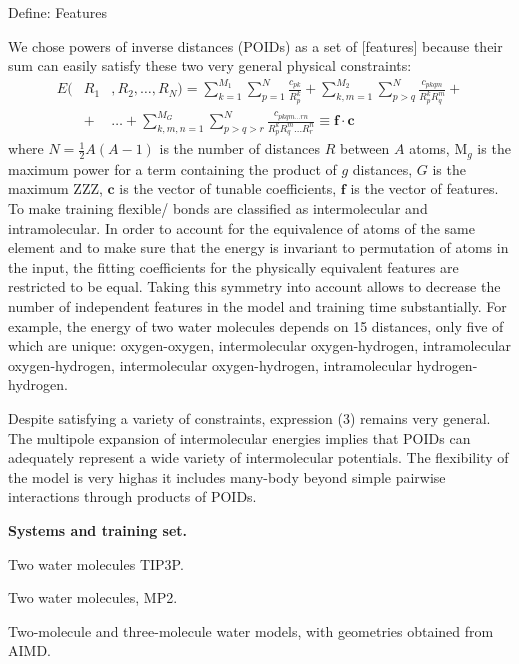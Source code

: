 \documentclass[aps,prl,reprint,amsmath,amssymb,nature]{revtex4-1}
\begin{document}
Define: Features

We chose powers of inverse distances (POIDs) as a set of [features] because their sum can easily satisfy these two very general physical constraints:
\begin{eqnarray}
E (&R_1&, R_2, \ldots, R_N) = \sum_{k=1}^{M_1} \sum_{p=1}^{N} \frac{c_{pk}}{R_p^k} + \sum_{k,m=1}^{M_2} \sum_{p>q}^{N} \frac{c_{pkqm}}{R_p^k R_q^m} + \nonumber \\
&+& \ldots +\sum_{k,m,n=1}^{M_G} \sum_{p>q>r}^{N} \frac{c_{pkqm\ldots rn}}{R_p^k R_q^m \ldots R_r^n} \equiv \mathbf{f}\cdot \mathbf{c}
\end{eqnarray}
%
where $N = \frac{1}{2}A(A-1)$ is the number of distances $R$ between $A$ atoms, M$_{g}$ is the maximum power for a term containing the product of $g$ distances, $G$ is the maximum ZZZ, $\mathbf{c}$ is the vector of tunable coefficients, $\mathbf{f}$ is the vector of features. 
\red To make training flexible/ bonds are classified as intermolecular and intramolecular. \old 
In order to account for the equivalence of atoms of the same element and to make sure that the energy is invariant to permutation of atoms in the input, the fitting coefficients for the physically equivalent features are restricted to be equal. 
Taking this symmetry into account allows to decrease the number of independent features in the model and training time substantially. 
For example, the energy of two water molecules depends on 15 distances, only five of which are unique: oxygen-oxygen, intermolecular oxygen-hydrogen, intramolecular oxygen-hydrogen, intermolecular oxygen-hydrogen, intramolecular hydrogen-hydrogen.

Despite satisfying a variety of constraints, expression (3) remains very general. 
The multipole expansion of intermolecular energies implies that POIDs can adequately represent a wide variety of intermolecular potentials. 
The flexibility of the model \red is very high\old as it includes many-body beyond simple pairwise interactions through products 
of POIDs.

\textbf{Systems and training set.} 


Two water molecules TIP3P.

Two water molecules, MP2.

Two-molecule and three-molecule water models, with geometries obtained 
from AIMD.
\end{document}
